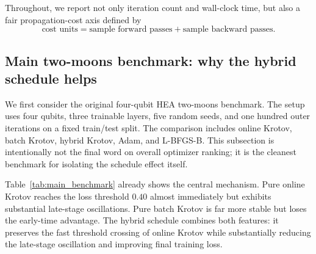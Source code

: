 \documentclass[aps,prb,10pt,twocolumn,superscriptaddress]{revtex4-2}
\begin{document}
Throughout, we report not only iteration count and wall-clock time, but also a fair propagation-cost axis defined by
\[
\text{cost units}
=
\text{sample forward passes}
+
\text{sample backward passes}.
\]

\subsection{Main two-moons benchmark: why the hybrid schedule helps}

We first consider the original four-qubit HEA two-moons benchmark.
The setup uses four qubits, three trainable layers, five random seeds, and one hundred outer iterations on a fixed train/test split.
The comparison includes online Krotov, batch Krotov, hybrid Krotov, Adam, and L-BFGS-B.
This subsection is intentionally not the final word on overall optimizer ranking; it is the cleanest benchmark for isolating the schedule effect itself.

Table~\ref{tab:main_benchmark} already shows the central mechanism.
Pure online Krotov reaches the loss threshold \(0.40\) almost immediately but exhibits substantial late-stage oscillations.
Pure batch Krotov is far more stable but loses the early-time advantage.
The hybrid schedule combines both features: it preserves the fast threshold crossing of online Krotov while substantially reducing the late-stage oscillation and improving final training loss.

\begin{table}[H]
\centering
{}
\caption{Main comparison on the aligned five-seed four-qubit two-moons benchmark.}
\label{tab:main_benchmark}
\end{table}
\end{document}
